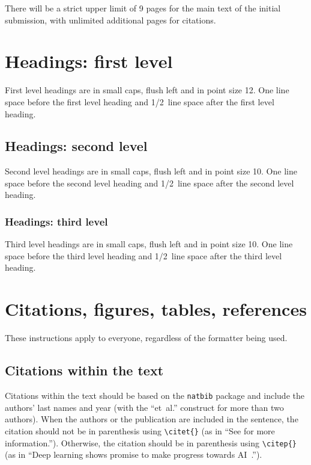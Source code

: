 \documentclass{article} %
\begin{document}
There will be a strict upper limit of 9 pages for the main text of the initial submission, with unlimited additional pages for citations. 

\section{Headings: first level}
\label{headings}

First level headings are in small caps,
flush left and in point size 12. One line space before the first level
heading and 1/2~line space after the first level heading.

\subsection{Headings: second level}

Second level headings are in small caps,
flush left and in point size 10. One line space before the second level
heading and 1/2~line space after the second level heading.

\subsubsection{Headings: third level}

Third level headings are in small caps,
flush left and in point size 10. One line space before the third level
heading and 1/2~line space after the third level heading.

\section{Citations, figures, tables, references}
\label{others}

These instructions apply to everyone, regardless of the formatter being used.

\subsection{Citations within the text}

Citations within the text should be based on the \texttt{natbib} package
and include the authors' last names and year (with the ``et~al.'' construct
for more than two authors). When the authors or the publication are
included in the sentence, the citation should not be in parenthesis using \verb|\citet{}| (as
in ``See \citet{Hinton06} for more information.''). Otherwise, the citation
should be in parenthesis using \verb|\citep{}| (as in ``Deep learning shows promise to make progress
towards AI~\citep{Bengio+chapter2007}.'').
\end{document}
